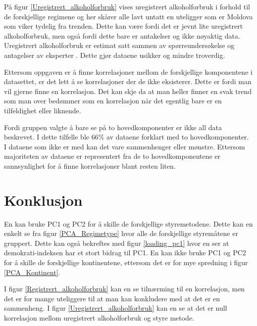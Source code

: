 \documentclass[twocolumn, 11pt]{article} %
\begin{document}
På figur \ref{Uregistrert_alkoholforbruk} vises uregistrert alkoholforbruk i forhold til de forskjellige regimene og her skårer alle lavt untatt en uteligger som er Moldova som viker tydelig fra trenden. Dette kan være fordi det er jevnt lite uregistrert alkoholforbruk, men også fordi dette bare er antakelser og ikke nøyaktig data.
Uregistrert alkoholforbruk er estimat satt sammen av spørreundersøkelse og antagelser av eksperter \cite{oppgavetekst}. Dette gjør dataene usikker og mindre troverdig.

\bigskip

Ettersom oppgaven er å finne korrelasjoner mellom de forskjellige komponentene i datasettet, er det lett å se korrelasjoner der de ikke eksisterer. Dette er fordi man vil gjerne finne en korrelasjon. Det kan skje da at man heller finner en svak trend som man over bedømmer som en korrelasjon når det egentlig bare er en tilfeldighet eller liknende. 

Fordi gruppen valgte å bare se på to hovedkomponenter er ikke all data beskrevet. I dette tilfelle ble 66\% av dataene forklart med to hovedkomponenter. I dataene som ikke er med kan det vare sammenhenger eller mønstre. Ettersom majoriteten av dataene er representert fra de to hovedkomponentene er sannsynlighet for å finne korrelasjoner blant resten liten.


\section{Konklusjon}
En kan bruke PC1 og PC2 for å skille de forskjellige styremetodene. Dette kan en enkelt se fra figur \ref{PCA_Regimetype} hvor alle de forskjellige styremåtene er gruppert. Dette kan også bekreftes med figur \ref{loading_pc1} hvor en ser at demokrati-indeksen har et stort bidrag til PC1. 
En kan ikke bruke PC1 og PC2 for å skille de forskjellige kontinentene, ettersom det er for mye spredning i figur \ref{PCA_Kontinent}. 

I figur \ref{Registrert_alkoholforbruk} kan en se tilnærming til en korrelasjon, men det er for mange uteliggere til at man kan konkludere med at det er en sammenheng. I figur \ref{Uregistrert_alkoholforbruk} kan en se at det er null korrelasjon mellom uregistrert alkoholforbruk og styre metode. 




\end{document}
